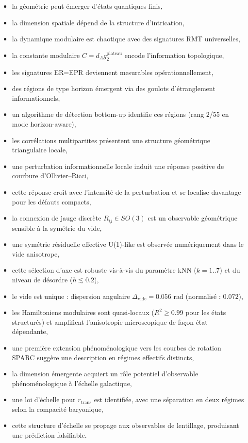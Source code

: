 \documentclass[11pt]{article}
\begin{document}
\begin{itemize}
\item la géométrie peut émerger d'états quantiques finis,
\item la dimension spatiale dépend de la structure d'intrication,
\item la dynamique modulaire est chaotique avec des signatures RMT universelles,
\item la constante modulaire $C=d_A g_2^{\mathrm{plateau}}$ encode l'information topologique,
\item les signatures ER=EPR deviennent mesurables opérationnellement,
\item des régions de type horizon émergent via des goulots d'étranglement informationnels,
\item un algorithme de détection bottom-up identifie ces régions (rang 2/55 en mode horizon-aware),
\item les corrélations multipartites présentent une structure géométrique triangulaire locale,
\item une perturbation informationnelle locale induit une réponse positive de courbure d'Ollivier--Ricci,
\item cette réponse croît avec l'intensité de la perturbation et se localise davantage pour les défauts compacts,
\item la connexion de jauge discrète $R_{ij} \in SO(3)$ est un observable géométrique sensible à la symétrie du vide,
\item une symétrie résiduelle effective U(1)-like est observée numériquement dans le vide anisotrope,
\item cette sélection d'axe est robuste vis-à-vis du paramètre kNN ($k=1..7$) et du niveau de désordre ($h \lesssim 0.2$),
\item le vide est unique : dispersion angulaire $\Delta_{\mathrm{vide}} = 0.056$ rad (normalisé : $0.072$),
\item les Hamiltoniens modulaires sont quasi-locaux ($R^2 \geq 0.99$ pour les états structurés) et amplifient l'anisotropie microscopique de façon état-dépendante,
\item une première extension phénoménologique vers les courbes de rotation SPARC suggère une description en régimes effectifs distincts,
\item la dimension émergente acquiert un rôle potentiel d'observable phénoménologique à l'échelle galactique,
\item une loi d'échelle pour $r_{\mathrm{trans}}$ est identifiée, avec une séparation en deux régimes selon la compacité baryonique,
\item cette structure d'échelle se propage aux observables de lentillage, produisant une prédiction falsifiable.
\end{itemize}
\end{document}
